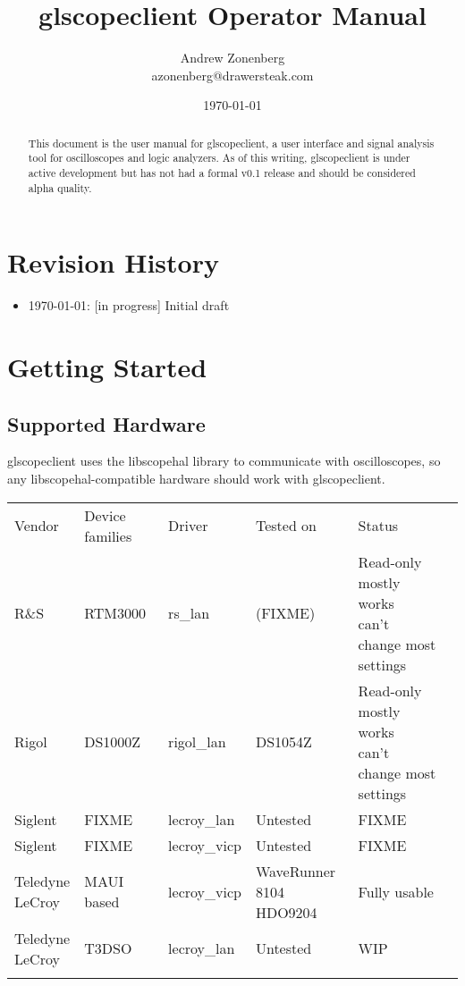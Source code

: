 \documentclass[11pt]{article}
\newcommand{\thickhline}{\Xhline{2.5\arrayrulewidth}}
\begin{document}
\title{glscopeclient Operator Manual}
\author{Andrew Zonenberg\\
azonenberg@drawersteak.com}
\date{\today}

\maketitle
\begin{abstract} \normalsize
This document is the user manual for glscopeclient, a user interface and signal analysis tool for oscilloscopes and
logic analyzers. As of this writing, glscopeclient is under active development but has not had a formal v0.1 release
and should be considered alpha quality.
\end{abstract}
\thispagestyle{empty}

\pagebreak

\tableofcontents

\pagebreak
\section{Revision History}
\begin{itemize}
\item \today: [in progress] Initial draft
\end{itemize}

\pagebreak
\section{Getting Started}

\subsection{Supported Hardware}

glscopeclient uses the libscopehal library to communicate with oscilloscopes, so any libscopehal-compatible hardware
should work with glscopeclient.

\begin{tabularx}{16cm}{lllllX}
\thickhline
Vendor & Device families & Driver & Tested on & Status \\
\thickhline
R\&S & RTM3000 & rs\_lan & (FIXME) & \makecell{Read-only mostly works\\can't change most settings} \\
\thickhline
Rigol & DS1000Z & rigol\_lan & DS1054Z & \makecell{Read-only mostly works\\can't change most settings} \\
\thickhline
Siglent & FIXME & lecroy\_lan & Untested & FIXME \\
\thickhline
Siglent & FIXME & lecroy\_vicp & Untested & FIXME \\
\thickhline
\makecell{Teledyne \\ LeCroy} & MAUI based & lecroy\_vicp & \makecell{WaveRunner 8104 \\ HDO9204} & Fully usable \\
\thickhline
\makecell{Teledyne \\ LeCroy} & T3DSO & lecroy\_lan & Untested & WIP \\
\thickhline
\end{tabularx}
\end{document}

